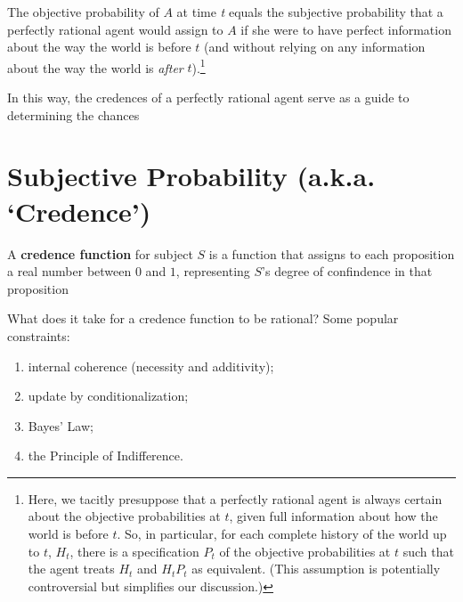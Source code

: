 \documentclass[12pt]{extarticle}
\begin{document}
\begin{description}
\item[The Objective--Subjective Connection]
The objective probability of $A$ at time \emph{t} equals the subjective probability that a perfectly rational agent would assign to $A$ if she were to have perfect information about the way the world is before $t$ (and without relying on any information about the way the world is \textit{after} $t$).\footnote{Here, we tacitly presuppose that a perfectly rational agent is always certain about the objective probabilities at $t$, given full information about how the world is before $t$. So, in particular, for each complete history of the world up to $t$, $H_t$, there is a specification $P_t$ of the objective probabilities at $t$ such that the agent treats $H_t$ and $H_tP_t$ as equivalent. (This assumption is potentially controversial but simplifies our discussion.)}

\item In this way, the credences of a perfectly rational agent serve as a guide to determining the chances


\end{description}

\section{Subjective Probability (a.k.a. `Credence')}

A \textbf{credence function} for subject $S$ is a function that assigns to each proposition a real number between $0$ and $1$, representing $S$'s degree of confindence in that proposition

\vspace{3mm}

What does it take for a credence function to be rational? Some popular constraints:


\begin{enumerate}
\item internal coherence (necessity and additivity);

\item update by conditionalization; 

\item Bayes' Law;

\item the Principle of Indifference.

\end{enumerate}
\end{document}
